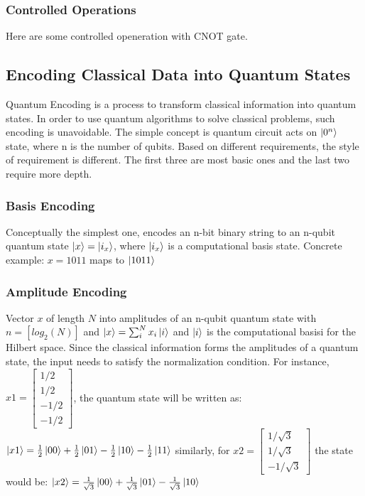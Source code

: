 \documentclass{article}
\begin{document}
\subsubsection*{Controlled Operations}
Here are some controlled openeration with CNOT gate. 

\subsection*{Encoding Classical Data into Quantum States}
Quantum Encoding is a process to transform classical information into quantum 
states. In order to use quantum algorithms to solve classical problems, 
such encoding is unavoidable. The simple concept is quantum circuit acts on 
$\ket{0^n}$ state, where n is the number of qubits. Based on different 
requirements, the style of requirement is different. The first three are 
most basic ones and the last two require more depth. 

\subsubsection*{Basis Encoding}
Conceptually the simplest one, encodes an n-bit binary string to an n-qubit 
quantum state $\ket{x} = \ket{i_x}$, where $\ket{i_x}$ is a computational
basis state. Concrete example: $ x =1011 $ maps to $\ket{1011}$

\subsubsection*{Amplitude Encoding}
Vector $x$ of length $N$ into amplitudes of an n-qubit quantum 
state with $n = [log_2(N)]$ and $
  \ket{x} = \sum^N_i x_i \ket{i} $
and $\ket{i}$ is the computational basisi for the Hilbert space. Since 
the classical information forms the amplitudes of a quantum state, the 
input needs to satisfy the normalization condition. For instance, 
$x1 = \begin{bmatrix}
  1/2 \\ 1/2 \\ -1/2 \\-1/2
\end{bmatrix}$, the quantum state will be written as: 
$\ket{x1} = \frac{1}{2} \ket{00} + \frac{1}{2} 
\ket{01} - \frac{1}{2} \ket{10} - \frac{1}{2} \ket{11}$
similarly, for $x2 = \begin{bmatrix}
  1/\sqrt{3} \\ 1/\sqrt{3} \\ -1/\sqrt{3} 
\end{bmatrix}$ the state would be:
$\ket{x2} = \frac{1}{\sqrt{3}} \ket{00} 
+ \frac{1}{\sqrt{3}} \ket{01} - \frac{1}{\sqrt{3}} \ket{10} $
\end{document}
